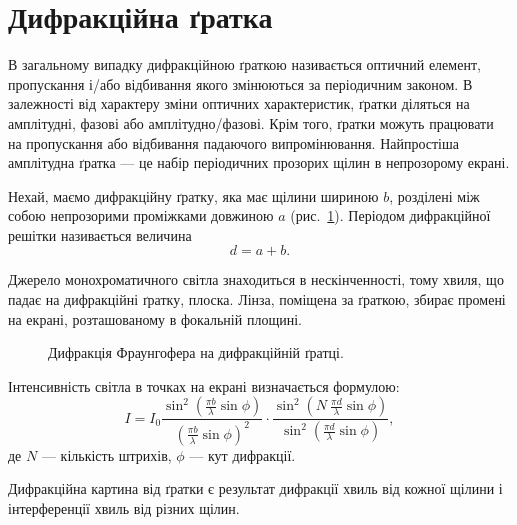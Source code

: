 





\section{Дифракційна ґратка}

В загальному випадку дифракційною ґраткою називається оптичний елемент, пропускання і/або відбивання якого змінюються за періодичним законом. В залежності від характеру зміни оптичних характеристик, ґратки діляться на амплітудні, фазові або амплітудно/фазові. Крім того, ґратки можуть працювати на пропускання або відбивання падаючого випромінювання. Найпростіша амплітудна ґратка --- це набір періодичних прозорих щілин в непрозорому екрані.

Нехай, маємо дифракційну ґратку, яка має щілини шириною $b$, розділені між собою непрозорими проміжками довжиною $a$ (рис.~\ref{pic:slots}). Періодом дифракційної решітки називається величина
\begin{equation*}
    d = a + b.
\end{equation*}


Джерело монохроматичного світла знаходиться в нескінченності, тому хвиля, що падає на дифракційні ґратку, плоска. Лінза, поміщена за ґраткою, збирає промені на екрані, розташованому в фокальній площині.

\begin{figure}[hb!]\centering
    
    \caption{Дифракція Фраунгофера на дифракційній ґратці.}
    \label{pic:slots}
\end{figure}


Інтенсивність світла в точках на екрані визначається формулою:
\begin{equation}\label{eq:Difraction_I_slots}
    I = I_0 \frac{\sin^2\left( {\frac{\pi b}{\lambda} \sin\phi}\right)}{\left( \frac{\pi b}{\lambda} \sin\phi\right)^2} \cdot
    \frac{\sin^2\left( {N\ \frac{\pi d}{\lambda} \sin\phi}\right)}{\sin^2\left( \frac{\pi d}{\lambda} \sin\phi\right)},
\end{equation}
де $N$ --- кількість штрихів, $\phi$ --- кут дифракції.

Дифракційна картина від ґратки є результат дифракції хвиль від кожної щілини і інтерференції хвиль від різних щілин.

